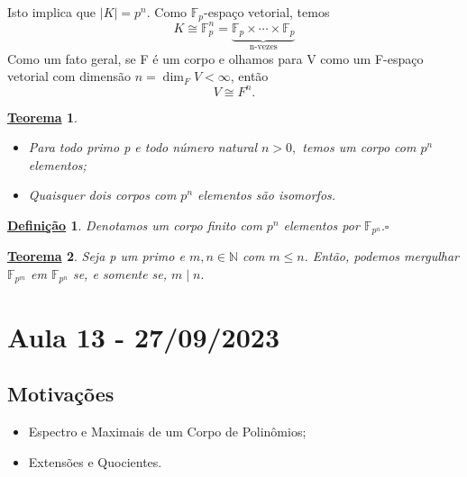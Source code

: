 \documentclass{article}
\newtheorem*{def*}{\underline{Defini\c c\~ao}}
\newtheorem*{theorem*}{\underline{Teorema}}
\begin{document}
Isto implica que \(|K| = p^{n}\). Como \(\mathbb{F}_{p}\)-espaço vetorial, temos 
\[
  K\cong{\mathbb{F}_{p}^{n}} = \underbrace{\mathbb{F}_{p}\times \cdots\times \mathbb{F}_{p}}_{\text{n-vezes}}
\]
Como um fato geral, se F é um corpo e olhamos para V como um F-espaço vetorial com dimensão \(n = \dim_{F}V < \infty\), então 
\[
  V\cong{F^{n}}.
\]
\begin{theorem*}
  \begin{itemize}
    \item[1)] Para todo primo p e todo número natural \(n > 0,\) temos um corpo com \(p^{n}\) elementos;
    \item[2)] Quaisquer dois corpos com \(p^{n}\) elementos são isomorfos.
  \end{itemize}
\end{theorem*}
\begin{def*}
  Denotamos um corpo finito com \(p^{n}\) elementos por \(\mathbb{F}_{p^{n}}.\square\)
\end{def*}
\begin{theorem*}
  Seja p um primo e \(m, n\in \mathbb{N}\) com \(m\leq n.\) Então, podemos mergulhar \(\mathbb{F}_{p^{m}}\) em \(\mathbb{F}_{p^{n}}\) se, e somente se, \(m\mid n.\)
\end{theorem*}
\newpage

\section{Aula 13 - 27/09/2023}
\subsection{Motivações}
\begin{itemize}
  \item Espectro e Maximais de um Corpo de Polinômios;
  \item Extensões e Quocientes.
\end{itemize}
\end{document}
